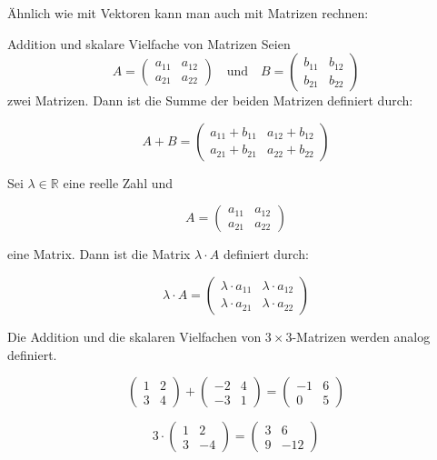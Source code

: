 \clearpage
Ähnlich wie mit Vektoren kann man auch mit Matrizen rechnen:
\begin{definition}
    {Addition und skalare Vielfache von Matrizen}{}
    Seien 
\[
A = \begin{pmatrix} a_{11} & a_{12} \\ a_{21} & a_{22} \end{pmatrix} 
\quad \text{und} \quad 
B = \begin{pmatrix} b_{11} & b_{12} \\ b_{21} & b_{22} \end{pmatrix}
\]
zwei Matrizen. Dann ist die Summe der beiden Matrizen definiert durch:

\[
A + B =
\begin{pmatrix} 
a_{11} + b_{11} & a_{12} + b_{12} \\ 
a_{21} + b_{21} & a_{22} + b_{22} 
\end{pmatrix}
\]

Sei \( \lambda \in \mathbb{R} \) eine reelle Zahl und 

\[
A = \begin{pmatrix} a_{11} & a_{12} \\ a_{21} & a_{22} \end{pmatrix}
\]

eine Matrix. Dann ist die Matrix \( \lambda \cdot A \) definiert durch:

\[
\lambda \cdot A =
\begin{pmatrix} 
\lambda \cdot a_{11} & \lambda \cdot a_{12} \\ 
\lambda \cdot a_{21} & \lambda \cdot a_{22} 
\end{pmatrix}
\]

Die Addition und die skalaren Vielfachen von \( 3 \times 3 \)-Matrizen werden analog definiert.

\end{definition}

\begin{bsp}
    {}{}
    \[
\begin{pmatrix} 1 & 2 \\ 3 & 4 \end{pmatrix} 
+ 
\begin{pmatrix} -2 & 4 \\ -3 & 1 \end{pmatrix} 
=
\begin{pmatrix} -1 & 6 \\ 0 & 5 \end{pmatrix}
\]

\[
3 \cdot 
\begin{pmatrix} 1 & 2 \\ 3 & -4 \end{pmatrix} 
=
\begin{pmatrix} 3 & 6 \\ 9 & -12 \end{pmatrix}
\]

\end{bsp}

